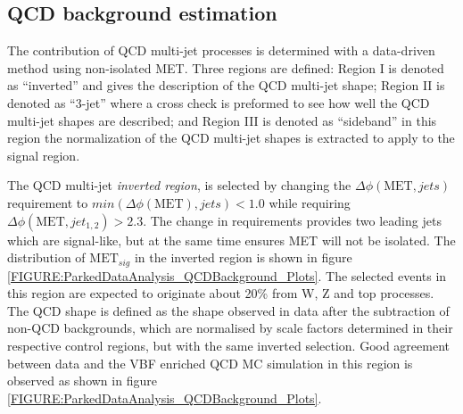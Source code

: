 \subsection{QCD background estimation}
\label{SECTION:ParkedDataAnalysis_ControlRegions_QCDBackground}


The contribution of \gls{QCD} multi-jet processes is determined with a data-driven method using non-isolated \gls{MET}. Three regions are defined: Region I is denoted as ``inverted'' and gives the description of the \gls{QCD} multi-jet shape; Region II is denoted as ``3-jet'' where a cross check is preformed to see how well the \gls{QCD} multi-jet shapes are described; and Region III is denoted as ``sideband'' in this region the normalization of the \gls{QCD} multi-jet shapes is extracted to apply to the signal region.

The \gls{QCD} multi-jet \textit{inverted region}, is selected by changing the $\Delta\phi(\text{MET},jets)$ requirement to $min(\Delta\phi(\text{MET}),jets)<1.0$ while requiring $\Delta\phi(\text{MET},jet_{1,2})>2.3$. The change in requirements provides two leading jets which are signal-like, but at the same time ensures \gls{MET} will not be isolated. The distribution of $\text{MET}_{sig}$ in the inverted region is shown in figure \ref{FIGURE:ParkedDataAnalysis_QCDBackground_Plots}. The selected events in this region are expected to originate about 20\% from W, Z and top processes. The \gls{QCD} shape is defined as the shape observed in data after the subtraction of non-\gls{QCD} backgrounds, which are normalised by scale factors determined in their respective control regions, but with the same inverted selection. Good agreement between data and the \gls{VBF} enriched \gls{QCD} \gls{MC} simulation in this region is observed as shown in figure \ref{FIGURE:ParkedDataAnalysis_QCDBackground_Plots}.


